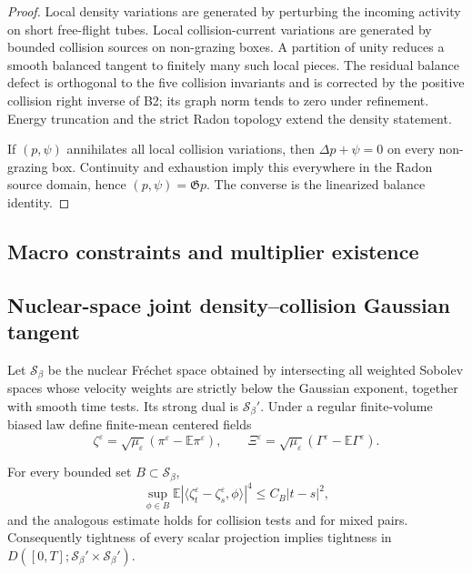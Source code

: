 \begin{proof}
Local density variations are generated by perturbing the incoming activity on
short free-flight tubes.  Local collision-current variations are generated by
bounded collision sources on non-grazing boxes.  A partition of unity reduces
a smooth balanced tangent to finitely many such local pieces.  The residual
balance defect is orthogonal to the five collision invariants and is corrected
by the positive collision right inverse of B2; its graph norm tends to zero
under refinement.  Energy truncation and the strict Radon topology extend the
density statement.

If \((p,\psi)\) annihilates all local collision variations, then
\(\Delta p+\psi=0\) on every non-grazing box.  Continuity and exhaustion imply
this everywhere in the Radon source domain, hence
\((p,\psi)=\mathfrak Gp\).  The converse is the linearized balance identity.
\end{proof}

\subsection{Macro constraints and multiplier existence}

\subsection{Nuclear-space joint density--collision Gaussian tangent}

Let \(\mathscr S_\beta\) be the nuclear Fr\'echet space obtained by intersecting
all weighted Sobolev spaces whose velocity weights are strictly below the
Gaussian exponent, together with smooth time tests.  Its strong dual is
\(\mathscr S_\beta'\).  Under a regular finite-volume biased law define
finite-mean centered fields
\[
 \zeta^\varepsilon
 =\sqrt{\mu_\varepsilon}
 (\pi^\varepsilon-\mathbb E\pi^\varepsilon),
 \qquad
 \Xi^\varepsilon
 =\sqrt{\mu_\varepsilon}
 (\Gamma^\varepsilon-\mathbb E\Gamma^\varepsilon).
\]

\begin{lemma}
\label{lem:r4-b3-tightness}
For every bounded set \(B\subset\mathscr S_\beta\),
\[
 \sup_{\phi\in B}
 \mathbb E|\langle\zeta_t^\varepsilon-\zeta_s^\varepsilon,\phi\rangle|^4
 \le C_B|t-s|^2,
\]
and the analogous estimate holds for collision tests and for mixed pairs.
Consequently tightness of every scalar projection implies tightness in
\(D([0,T];\mathscr S_\beta'\times\mathscr S_\beta')\).
\end{lemma}

